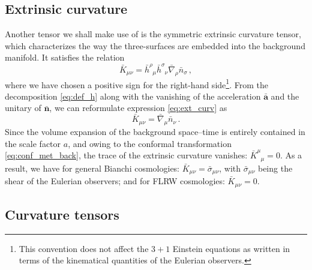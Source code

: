 \documentclass[notitlepage,onecolumn,floatfix,preprintnumbers,aps,prd,showpacs,nofootinbib,amsmath,amssymb,amsfonts]{revtex4-1}
\newcommand{\be}{\begin{equation}}
\newcommand{\ee}{\end{equation}}
\newcommand{\<}{\langle}
\renewcommand{\>}{\rangle}
\begin{document}
\subsection{Extrinsic curvature} \label{subsec:extr_curv}

Another tensor we shall make use of is the symmetric extrinsic curvature tensor, 
which characterizes the way the three-surfaces are embedded into the background manifold. 
It satisfies the relation 
\be
	\bar K_{\mu\nu} 
		= \bar h^{\rho}_{\phantom{\rho} \mu} \bar h^{\sigma}_{\phantom{\sigma} \nu} \bar \nabla_\rho \bar n_\sigma \, , 
	\label{eq:ext_curv}
\ee
where we have chosen a positive sign for the right-hand side\footnote{%
%
This convention does not affect the $3+1$ Einstein equations as written 
in terms of the kinematical quantities of the Eulerian observers.
%
}. 
From the decomposition \eqref{eq:def_h} along with the vanishing of the 
acceleration $\bm{\bar a}$ and the unitary of $\bm{\bar n}$, we can reformulate expression \eqref{eq:ext_curv} as 
\be
	\bar K_{\mu\nu} = \bar \nabla_{\mu} \bar n_{\nu} \, . 
\ee
Since the volume expansion of the background space--time is entirely contained in the scale factor $a$, 
and owing to the conformal transformation \eqref{eq:conf_met_back}, the trace of the extrinsic curvature vanishes: 
$\bar K^{\mu}_{\phantom{\mu}\mu} = 0$. As a result, we have for general Bianchi cosmologies: 
$\bar K_{\mu\nu} = \bar \sigma_{\mu\nu}$, with $\bar \sigma_{\mu\nu}$ being the shear of the Eulerian observers; 
and for FLRW cosmologies: $\bar K_{\mu\nu} = 0$. 

\subsection{Curvature tensors}
\end{document}
